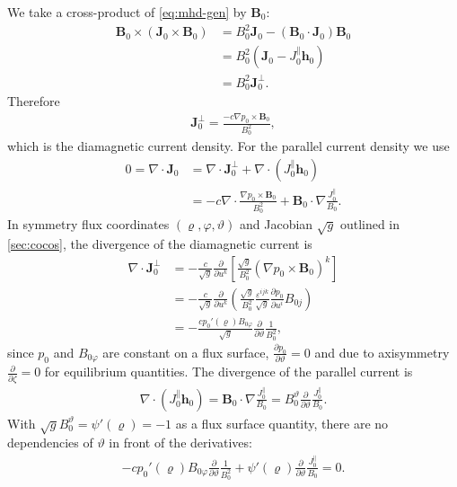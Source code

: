 \documentclass[a4paper, twoside, 10pt, english]{article}
\numberwithin{equation}{section}
\let\temp\varrho
\let\varrho\rho
\let\rho\temp
\let\temp\vartheta
\let\vartheta\theta
\let\theta\temp
\let\temp\varphi
\let\varphi\phi
\let\phi\temp
\let\vec\symbf
\newcommand*\grad{\ensuremath{\nabla}}
\newcommand*\divg{\ensuremath{\nabla \cdot}}
\newcommand*\pd[2][]{\ensuremath{\frac{\partial #1}{\partial #2}}}  %
\begin{document}
We take a cross-product of \cref{eq:mhd-gen} by $\vec{B}_{0}$:
\begin{align}
  \vec{B}_{0} \times \left( \vec{J}_{0} \times \vec{B}_{0} \right) &= B_{0}^{2} \vec{J}_{0} - (\vec{B}_{0} \cdot \vec{J}_{0}) \vec{B}_{0} \nonumber \\
  &= B_{0}^{2} (\vec{J}_{0} - J_{0}^{\parallel} \vec{h}_{0}) \nonumber \\
  &= B_{0}^{2} \vec{J}_{0}^{\perp}.
\end{align}
Therefore
\begin{gather}
  \vec{J}_{0}^{\perp} = \frac{-c \grad p_{0} \times \vec{B}_{0}}{B_{0}^{2}},
\end{gather}
which is the diamagnetic current density. For the parallel current density we use
\begin{align}
 0 = \divg \vec{J}_{0} &= \divg \vec{J}_{0}^{\perp} + \divg (J_{0}^{\parallel} \vec{h}_{0}) \nonumber \\
 &= -c \divg \frac{\grad p_{0} \times \vec{B}_{0}}{B_{0}^{2}} + \vec{B}_{0} \cdot \grad \frac{J_{0}^{\parallel}}{B_{0}}.
\end{align}
In symmetry flux coordinates $(\rho, \phi, \theta)$ and Jacobian $\sqrt{g}$ outlined in \cref{sec:cocos}, the divergence of the diamagnetic current is
\begin{align}
  \divg \vec{J}_{0}^{\perp} &= -\frac{c}{\sqrt{g}} \pd{u^{k}} \left[ \frac{\sqrt{g}}{B_{0}^{2}} \left( \grad p_{0} \times \vec{B}_{0} \right)^{k} \right] \nonumber \\
  &= -\frac{c}{\sqrt{g}} \pd{u^{k}} \left( \frac{\sqrt{g}}{B_{0}^{2}} \frac{\varepsilon^{ijk}}{\sqrt{g}} \pd[p_{0}]{u^{i}} B_{0 j} \right) \nonumber \\
  &= -\frac{c p_{0}' (\rho) B_{0 \phi}}{\sqrt{g}} \pd{\theta} \frac{1}{B_{0}^{2}},
\end{align}
since $p_{0}$ and $B_{0 \phi}$ are constant on a flux surface, $\pd[p_{0}]{\theta} = 0$ and due to axisymmetry $\pd{\zeta} = 0$ for equilibrium quantities. The divergence of the parallel current is
\begin{gather}
  \divg(J_{0}^{\parallel} \vec{h}_{0}) = \vec{B}_{0} \cdot \grad \frac{J_{0}^{\parallel}}{B_{0}} = B_{0}^{\theta} \pd{\theta} \frac{J_{0}^{\parallel}}{B_{0}}.
\end{gather}
With $\sqrt{g} B_{0}^{\theta} = \psi'(\rho) = -1$ as a flux surface quantity, there are no dependencies of $\theta$ in front of the derivatives:
\begin{gather}
  -c p_{0}' (\rho) B_{0 \phi} \pd{\theta} \frac{1}{B_{0}^{2}} + \psi'(\rho) \pd{\theta} \frac{J_{0}^{\parallel}}{B_{0}} = 0.
\end{gather}
\end{document}
